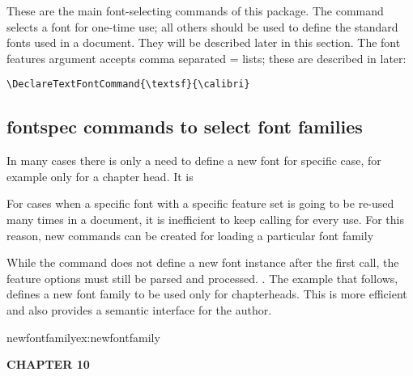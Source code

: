 These are the main font-selecting commands of this package. The 
command selects a font for one-time use; all others should be used to deﬁne the
standard fonts used in a document. They will be described later in this section.
The font features argument accepts comma separated =
lists; these are described in later:

\ifxetex
\begin{texexample}{}{}
\bgroup
{}
\raggedright
\knutext

\newfontfamily{}
  \calibri 


\def\setchapterfont{\calibri\huge}

\textsf{\large \lorem}
\egroup
\end{texexample}
\fi

\begin{verbatim}
\DeclareTextFontCommand{\textsf}{\calibri}
\end{verbatim}

\subsection{fontspec commands to select font families}

In many cases there is only a need to define a new font for specific case, for example only for a chapter head. It is 

\CMDI{\newfontfamily}

For cases when a specific font with a specific feature set is going to be re-used
many times in a document, it is inefficient to keep calling  for every use. For this reason, new commands can be created for loading a particular font family

While the  command does not define a new font instance after the first
call, the feature options must still be parsed and processed.
. The example that follows, defines a new font family to be used only for chapterheads. This is more efficient and also provides a semantic interface for the author.

\begin{texexample}{newfontfamily}{ex:newfontfamily}
 
\newfontfamily{}
\def\setchapterfont{%
   \calibri\huge\bfseries}

\bgroup
\setchapterfont CHAPTER 10
\egroup
\end{texexample}

